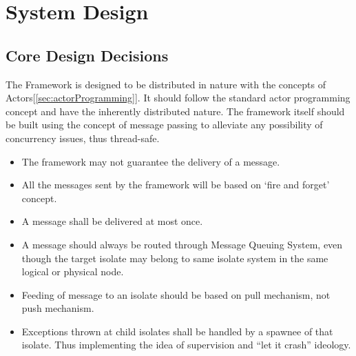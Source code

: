 \chapter{System Design}\label{chapter:general_design_decisions}

\section{Core Design Decisions}
The Framework is designed to be distributed in nature with the concepts of Actors[\autoref{sec:actorProgramming}]. It should follow the standard actor programming concept and have the inherently distributed nature. The framework itself should be built using the concept of message passing to alleviate any possibility of concurrency issues, thus thread-safe.
\begin{itemize}
  \item The framework may not guarantee the delivery of a message.
  \item All the messages sent by the framework will be based on ‘fire and forget’ concept.
  \item A message shall be delivered at most once.
  \item A message should always be routed through Message Queuing System, even though the target isolate may belong to same isolate system in the same logical or physical node.
  \item Feeding of message to an isolate should be based on pull mechanism, not push mechanism.
  \item Exceptions thrown at child isolates shall be handled by a spawnee of that isolate. Thus implementing the idea of supervision and “let it crash” ideology.
\end{itemize}

